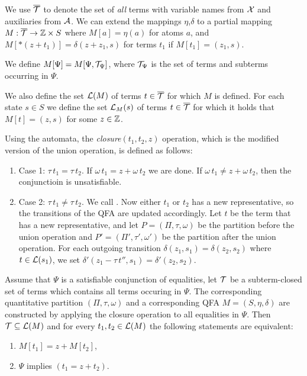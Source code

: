 We use ${\overline{\mathcal{T}}}$ to denote the set of \emph{all} terms with variable names from $\mathcal{X}$ and auxiliaries from $\mathcal{A}$.
We can extend the mappings $\eta$,$\delta$ to a partial mapping $M : {\overline{\mathcal{T}}} \rightarrow \mathbb{Z} \times S$ where $M[a] = \eta(a)$ for atoms $a$, and $M[*(z+t_1)] = \delta(z+z_1, s)$ for terms $t_1$ if $M[t_1] = (z_1,s)$.

We define $M[\Psi] = M[\Psi,\mathcal{T}_\Psi]$, where $\mathcal{T}_\Psi$ is the set of terms and subterms occurring in $\Psi$.

We also define the set $\mathcal{L}(M)$ of terms $t \in {\overline{\mathcal{T}}}$ for which $M$ is defined.
For each state $s \in S$ we define the set $\mathcal{L}_M(s)$ of terms $t \in {\overline{\mathcal{T}}}$ for which it holds that $M[t] = (z, s)$ for some $z \in \mathbb{Z}$.

Using the automata, the \emph{closure}$(t_1,t_2,z)$ operation, which is the modified version of the union operation, is defined as follows:

\begin{enumerate}
  \item Case 1: $\tau\,t_1 = \tau\,t_2$. If $\omega\,t_1 = z + \omega\,t_2$ we are done.
  If $\omega\,t_1 \neq z + \omega\,t_2$, then the conjunctioin is unsatisfiable.
  \item Case 2: $\tau\,t_1 \neq \tau\,t_2$. We call .
  Now either $t_1$ or $t_2$ has a new representative, so the transitions of the QFA are updated accordingly.
  Let $t$ be the term that has a new representative,
  and let $P = (\Pi, \tau, \omega)$ be the partition before the union operation and $P' = (\Pi', \tau', \omega')$ be the partition after the union operation.
  For each outgoing transition $\delta(z_1, s_1) = \delta(z_2, s_2)$ where $t \in \mathcal{L}(s_1)$,
  we set $\delta'(z_1 - \tau\,t'', s_1) = \delta'(z_2, s_2)$.
\end{enumerate}


\begin{theorem}
  Assume that $\Psi$ is a satisfiable conjunction of equalities, let $\mathcal{T}$ be a subterm-closed set of terms which contains all terms occuring in $\Psi$.
  The corresponding quantitative partition $(\Pi, \tau,\omega)$ and a corresponding QFA $M = (S, \eta, \delta)$ are constructed by applying the closure operation to all equalities in $\Psi$.
  Then $\mathcal{T} \subseteq \mathcal{L}(M)$ and for every $t_1, t_2 \in \mathcal{L}(M)$ the following statements are equivalent:
  \begin{enumerate}
    \item $M[t_1] = z + M[t_2]$,
    \item $\Psi$ implies $(t_1 = z + t_2)$.
  \end{enumerate}
\end{theorem}


